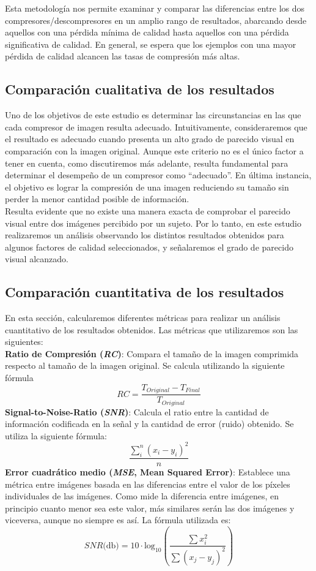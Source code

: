 \documentclass[12pt,a4paper]{article}
\begin{document}
Esta metodología nos permite examinar y comparar las diferencias entre los dos compresores/descompresores en un amplio rango de resultados, abarcando desde aquellos con una pérdida mínima de calidad hasta aquellos con una pérdida significativa de calidad. En general, se espera que los ejemplos con una mayor pérdida de calidad alcancen las tasas de compresión más altas.\\

\subsection{Comparación cualitativa de los resultados}
Uno de los objetivos de este estudio es determinar las circunstancias en las que cada compresor de imagen resulta adecuado. Intuitivamente, consideraremos que el resultado es adecuado cuando presenta un alto grado de parecido visual en comparación con la imagen original. Aunque este criterio no es el único factor a tener en cuenta, como discutiremos más adelante, resulta fundamental para determinar el desempeño de un compresor como ``adecuado''. En última instancia, el objetivo es lograr la compresión de una imagen reduciendo su tamaño sin perder la menor cantidad posible de información.\\

Resulta evidente que no existe una manera exacta de comprobar el parecido visual entre dos imágenes percibido por un sujeto. Por lo tanto, en este estudio realizaremos un análisis observando los distintos resultados obtenidos para algunos factores de calidad seleccionados, y señalaremos el grado de parecido visual alcanzado.\\


\subsection{Comparación cuantitativa de los resultados} \label{metricasCuant}
En esta sección, calcularemos diferentes métricas para realizar un análisis cuantitativo de los resultados obtenidos. Las métricas que utilizaremos son las siguientes:\\
\textbf{Ratio de Compresión (\textit{RC})}: Compara el tamaño de la imagen comprimida respecto al tamaño de la imagen original. Se calcula utilizando la siguiente fórmula
\[
RC = \frac{T_{Original}-T_{Final}}{T_{Original}}
\]
\textbf{Signal-to-Noise-Ratio (\textit{SNR})}: Calcula el ratio entre la cantidad de información codificada en la señal y la cantidad de error (ruido) obtenido. Se utiliza la siguiente fórmula:
\[
\frac{\sum_i^n(x_i-y_i)^2}{n}
\]
\textbf{Error cuadrático medio (\textit{MSE}, Mean Squared Error)}: Establece una métrica entre imágenes basada en las diferencias entre el valor de los píxeles individuales de las imágenes. Como mide la diferencia entre imágenes, en principio cuanto menor sea este valor, más similares serán las dos imágenes y viceversa, aunque no siempre es así. La fórmula utilizada es:
\[
SNR\text{(db)} = 10\cdot \text{log}_{10} \left( \frac{\sum x_i^2}{\sum(x_j-y_j)^2} \right)
\]
\end{document}
